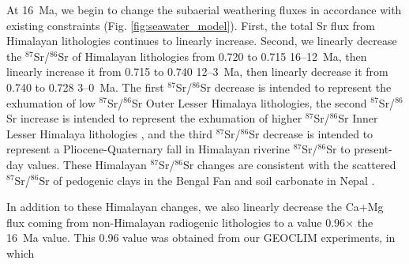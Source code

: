 \documentclass[11pt,letterpaper]{article}
\newcommand{\SrSr}{$^{87}$Sr/$^{86}$Sr\xspace}
\begin{document}
At 16~Ma, we begin to change the subaerial weathering fluxes in accordance with existing constraints (Fig. \ref{fig:seawater_model}). First, the total Sr flux from Himalayan lithologies continues to linearly increase. Second, we linearly decrease the \SrSr of Himalayan lithologies from 0.720 to 0.715 16--12~Ma, then linearly increase it from 0.715 to 0.740 12--3~Ma, then linearly decrease it from 0.740 to 0.728 3--0~Ma. The first \SrSr decrease is intended to represent the exhumation of low \SrSr Outer Lesser Himalaya lithologies, the second \SrSr increase is intended to represent the exhumation of higher \SrSr Inner Lesser Himalaya lithologies \citep{Myrow2015a, Colleps2018a}, and the third \SrSr decrease is intended to represent a Pliocene-Quaternary fall in Himalayan riverine \SrSr to present-day values. These Himalayan \SrSr changes are consistent with the scattered \SrSr of pedogenic clays in the Bengal Fan and soil carbonate in Nepal \citep{Derry1996a, Quade1997a}.

In addition to these Himalayan changes, we also linearly decrease the Ca+Mg flux coming from non-Himalayan radiogenic lithologies to a value 0.96$\times$ the 16~Ma value. This 0.96 value was obtained from our GEOCLIM experiments, in which 

\clearpage

\singlespacing

\newpage



\end{document}
